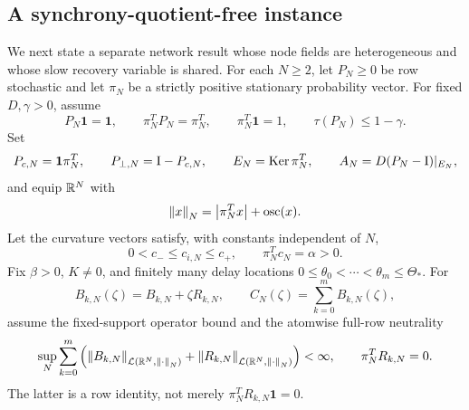 \subsection{A synchrony-quotient-free instance}

We next state a separate network result whose node fields are heterogeneous
and whose slow recovery variable is shared.  For each \(N\ge2\), let
\(P_N\ge0\) be row stochastic and let \(\pi_N\) be a strictly positive
stationary probability vector.  For fixed \(D,\gamma>0\), assume
\begin{equation}
 P_N\mathbf1=\mathbf1,\qquad
 \pi_N^TP_N=\pi_N^T,\qquad \pi_N^T\mathbf1=1,\qquad
 \tau(P_N)\le1-\gamma.                                \label{eq:shared-markov}
\end{equation}
Set
\begin{equation}
 P_{c,N}=\mathbf1\pi_N^T,\qquad P_{\perp,N}=\mathrm I-P_{c,N},\qquad
 E_N=\operatorname{Ker}\pi_N^T,\qquad A_N=D(P_N-\mathrm I)|_{E_N},       \label{eq:shared-splitting}
\end{equation}
and equip \(\mathbb R^N\) with
\begin{equation}
 \left\lVert x\right\rVert_N=\left\lvert\pi_N^Tx\right\rvert+\operatorname{osc}(x).                   \label{eq:shared-norm}
\end{equation}
Let the curvature vectors satisfy, with constants independent of \(N\),
\begin{equation}
 0<c_-\le c_{i,N}\le c_+,\qquad \pi_N^Tc_N=\alpha>0. \label{eq:shared-curvature}
\end{equation}
Fix \(\beta>0\), \(K\ne0\), and finitely many delay locations
\(0\le\theta_0<\cdots<\theta_m\le\Theta_*\).  For
\begin{equation}
 B_{k,N}(\zeta)=B_{k,N}+\zeta R_{k,N},\qquad
 C_N(\zeta)=\sum_{k=0}^mB_{k,N}(\zeta),                \label{eq:shared-layers}
\end{equation}
assume the fixed-support operator bound and the atomwise full-row
neutrality
\begin{equation}
 \sup_N\sum_{k=0}^m
 \left(\left\lVert B_{k,N}\right\rVert_{\mathcal L(\mathbb R^N,\left\lVert\cdot\right\rVert_N)}
       +\left\lVert R_{k,N}\right\rVert_{\mathcal L(\mathbb R^N,\left\lVert\cdot\right\rVert_N)}\right)<\infty,
 \qquad \pi_N^TR_{k,N}=0.                             \label{eq:shared-layer-bounds}
\end{equation}
The latter is a row identity, not merely
\(\pi_N^TR_{k,N}\mathbf1=0\).

